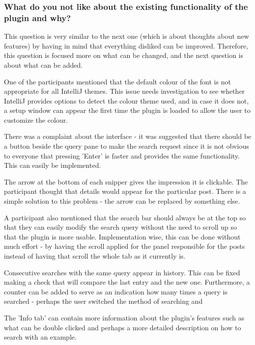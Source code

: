 \documentclass{l4proj}
\begin{document}
\subsubsection{What do you not like about the existing functionality of the plugin and why?}

This question is very similar to the next one (which is about thoughts about new features) by having in mind that everything disliked can be improved. Therefore, this question is focused more on what can be changed, and the next question is about what can be added.

\noindent
One of the participants mentioned that the default colour of the font is not appropriate for all IntelliJ themes. This issue needs investigation to see whether IntelliJ provides options to detect the colour theme used, and in case it does not, a setup window can appear the first time the plugin is loaded to allow the user to customize the colour. 

\noindent
There was a complaint about the interface - it was suggested that there should be a button beside the query pane to make the search request since it is not obvious to everyone that pressing 'Enter' is faster and provides the same functionality. This can easily be implemented.

\noindent
The arrow at the bottom of each snipper gives the impression it is clickable. The participant thought that details would appear for the particular post. There is a simple solution to this problem - the arrow can be replaced by something else.

\noindent
A participant also mentioned that the search bar should always be at the top so that they can easily modify the search query without the need to scroll up so that the plugin is more usable. Implementation wise, this can be done without much effort - by having the scroll applied for the panel responsible for the posts instead of having that scroll the whole tab as it currently is.

\noindent
Consecutive searches with the same query appear in history. This can be fixed making a check that will compare the last entry and the new one. Furthermore, a counter can be added to serve as an indication how many times a query is searched - perhaps the user switched the method of searching and

\noindent
The 'Info tab' can contain more information about the plugin's features such as what can be double clicked and perhaps a more detailed description on how to search with an example.
\end{document}
